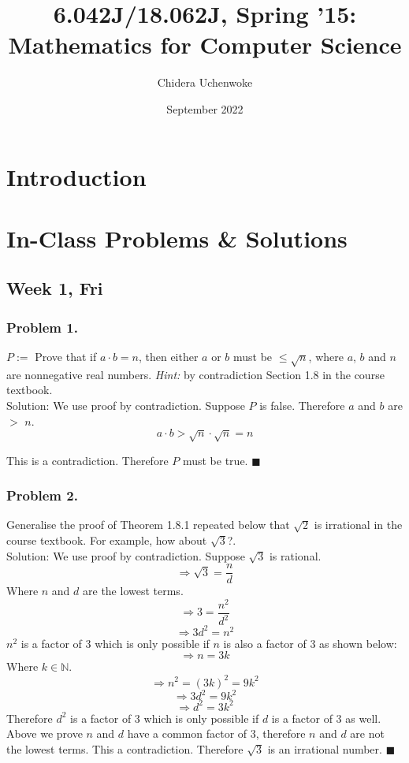\documentclass{article}
\title{6.042J/18.062J, Spring '15: Mathematics for Computer Science}
\author{Chidera Uchenwoke}
\date{September 2022}
\begin{document}
\maketitle
\tableofcontents

\section{Introduction}

\section{In-Class Problems \& Solutions}
\subsection{Week 1, Fri}

\subsubsection{Problem 1.}
\(P := \) Prove that if \(a \cdot b = n \), then either \( a\) or \( b\) must be \(\leq \sqrt{n}\), where \(a\), \(b\) and \(n\) are nonnegative real numbers. \textit{Hint:} by contradiction Section 1.8 in the course textbook. 
\\[5pt]
Solution: We use proof by contradiction. Suppose \(P\) is false. Therefore \(a\) and \(b\) are \(>\) \(n\).
\[a \cdot b > \sqrt{n} \cdot \sqrt{n} = n\]

\noindent This is a contradiction. Therefore \(P\) must be true.
$ \blacksquare $

\subsubsection{Problem 2.}
Generalise the proof of Theorem 1.8.1 repeated below that $\sqrt{2}$ is irrational in the course textbook. For example, how about $\sqrt{3}$?.
\\[5pt]
Solution: We use proof by contradiction. Suppose \(\sqrt{3}\) is rational. 
\[\Rightarrow \sqrt{3} = \frac{n}{d}\]
Where \(n\) and \(d\) are the lowest terms.
\[\Rightarrow 3 = \frac{n^2}{d^2}\]
\[\Rightarrow 3d^2 = n^2 \]
\(n^2\) is a factor of 3 which is only possible if \(n\) is also a factor of 3 as shown below:
\[\Rightarrow n = 3k\]
Where \(k \in \mathbb{N}\).
\[\Rightarrow n^2 = (3k)^2 = 9k^2\]
\[\Rightarrow 3d^2 = 9k^2\]
\[\Rightarrow d^2 = 3k^2\]
Therefore \(d^2\) is a factor of 3 which is only possible if \(d\) is a factor of 3 as well.
\\[5pt]
Above we prove \(n\) and \(d\) have a common factor of 3, therefore \(n\) and \(d\) are not the lowest terms. This a contradiction. Therefore $\sqrt{3}$ is an irrational number.
$\blacksquare$
\end{document}
